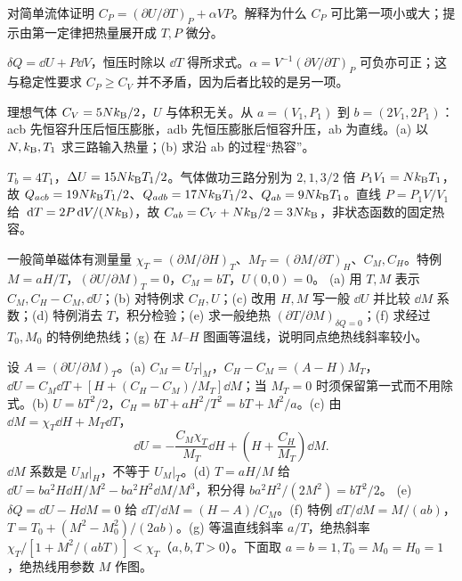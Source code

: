 \begin{exercise}
对简单流体证明 $C_P=(\partial U/\partial T)_P+\alpha VP$。解释为什么 $C_P$ 可比第一项小或大；提示由第一定律把热量展开成 $T,P$ 微分。
\end{exercise}
\begin{solution}
$\delta Q=\dd U+P\dd V$，恒压时除以 $\dd T$ 得所求式。$\alpha=V^{-1}(\partial V/\partial T)_P$ 可负亦可正；这与稳定性要求 $C_P\ge C_V$ 并不矛盾，因为后者比较的是另一项。
\end{solution}
\begin{exercise}
理想气体 $C_V=5Nk_{\mathrm B}/2$，$U$ 与体积无关。从 $a=(V_1,P_1)$ 到 $b=(2V_1,2P_1)$：acb 先恒容升压后恒压膨胀，adb 先恒压膨胀后恒容升压，ab 为直线。(a) 以 $N,k_{\mathrm B},T_1$ 求三路输入热量；(b) 求沿 ab 的过程“热容”。
\end{exercise}
\begin{solution}
$T_b=4T_1$，$\Delta U=15Nk_{\mathrm B} T_1/2$。气体做功三路分别为 $2,1,3/2$ 倍 $P_1V_1=Nk_{\mathrm B} T_1$，故 $Q_{acb}=19Nk_{\mathrm B} T_1/2$、$Q_{adb}=17Nk_{\mathrm B} T_1/2$、$Q_{ab}=9Nk_{\mathrm B} T_1$。直线 $P=P_1V/V_1$ 给 $\,\mathrm d T=2P\,\mathrm d V/(Nk_{\mathrm B})$，故 $C_{ab}=C_V+Nk_{\mathrm B}/2=3Nk_{\mathrm B}$，非状态函数的固定热容。
\end{solution}
\begin{exercise}
一般简单磁体有测量量 $\chi_T=(\partial M/\partial H)_T$、$M_T=(\partial M/\partial T)_H$、$C_M,C_H$。特例 $M=aH/T$，$(\partial U/\partial M)_T=0$，$C_M=bT$，$U(0,0)=0$。
(a) 用 $T,M$ 表示 $C_M,C_H-C_M,\dd U$；(b) 对特例求 $C_H,U$；(c) 改用 $H,M$ 写一般 $\dd U$ 并比较 $\dd M$ 系数；(d) 特例消去 $T$，积分检验；(e) 求一般绝热 $(\partial T/\partial M)_{\delta Q=0}$；(f) 求经过 $T_0,M_0$ 的特例绝热线；(g) 在 $M$--$H$ 图画等温线，说明同点绝热线斜率较小。
\end{exercise}
\begin{solution}
设 $A=(\partial U/\partial M)_T$。(a) $C_M=U_T|_M$，$C_H-C_M=(A-H)M_T$，$\dd U=C_M\dd T+[H+(C_H-C_M)/M_T]\dd M$；当 $M_T=0$ 时须保留第一式而不用除式。(b) $U=bT^2/2$，$C_H=bT+aH^2/T^2=bT+M^2/a$。(c) 由 $\dd M=\chi_T\dd H+M_T\dd T$，
\[\dd U=-\frac{C_M\chi_T}{M_T}\dd H+\left(H+\frac{C_H}{M_T}\right)\dd M.\]
$\dd M$ 系数是 $U_M|_H$，不等于 $U_M|_T$。(d) $T=aH/M$ 给 $\dd U=ba^2H\dd H/M^2-ba^2H^2\dd M/M^3$，积分得 $ba^2H^2/(2M^2)=bT^2/2$。
(e) $\delta Q=\dd U-H\dd M=0$ 给 $\dd T/\dd M=(H-A)/C_M$。(f) 特例 $\dd T/\dd M=M/(ab)$，$T=T_0+(M^2-M_0^2)/(2ab)$。(g) 等温直线斜率 $a/T$，绝热斜率 $\chi_T/[1+M^2/(abT)]<\chi_T$（$a,b,T>0$）。下面取 $a=b=1,T_0=M_0=H_0=1$，绝热线用参数 $M$ 作图。
\end{solution}
